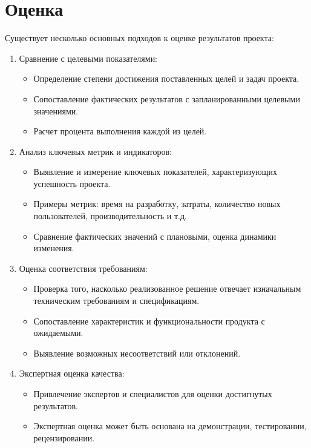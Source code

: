     \section{Оценка}
    Существует несколько основных подходов к оценке результатов проекта:
    \begin{enumerate}
        \item Сравнение с целевыми показателями:
            \begin{itemize}
                \item Определение степени достижения поставленных целей и задач проекта.
                \item Сопоставление фактических результатов с запланированными целевыми значениями.
                \item Расчет процента выполнения каждой из целей.
            \end{itemize}
        \item Анализ ключевых метрик и индикаторов:
            \begin{itemize}
                \item Выявление и измерение ключевых показателей, характеризующих успешность проекта.
                \item Примеры метрик: время на разработку, затраты, количество новых пользователей, производительность и т.д.
                \item Сравнение фактических значений с плановыми, оценка динамики изменения.
            \end{itemize}
        \item Оценка соответствия требованиям:
            \begin{itemize}
                \item Проверка того, насколько реализованное решение отвечает изначальным техническим требованиям и спецификациям.
                \item Сопоставление характеристик и функциональности продукта с ожидаемыми.
                \item Выявление возможных несоответствий или отклонений.
            \end{itemize}
        \item Экспертная оценка качества:
            \begin{itemize}
                \item Привлечение экспертов и специалистов для оценки достигнутых результатов.
                \item Экспертная оценка может быть основана на демонстрации, тестировании, рецензировании.

\end{itemize}
\end{enumerate}
